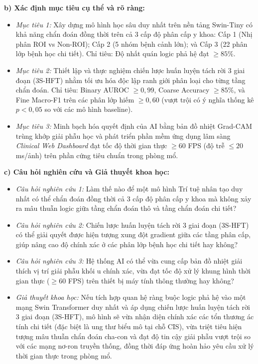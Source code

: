 \documentclass[a4paper]{article}
\begin{document}
\noindent\textbf{b) Xác định mục tiêu cụ thể và rõ ràng:}
\begin{itemize}
  \item \textit{Mục tiêu 1:} Xây dựng mô hình học sâu duy nhất trên nền tảng Swin-Tiny có khả năng chẩn đoán đồng thời trên cả 3 cấp độ phân cấp y khoa: Cấp 1 (Nhị phân ROI vs Non-ROI); Cấp 2 (5 nhóm bệnh cảnh lớn); và Cấp 3 (22 phân lớp bệnh học chi tiết). Chỉ tiêu: Độ nhất quán logic phả hệ đạt $\ge 85\%$.
  \item \textit{Mục tiêu 2:} Thiết lập và thực nghiệm chiến lược huấn luyện tách rời 3 giai đoạn (3S-HFT) nhằm tối ưu hóa độc lập ranh giới phân loại cho từng tầng chẩn đoán. Chỉ tiêu: Binary AUROC $\ge 0,99$, Coarse Accuracy $\ge 85\%$, và Fine Macro-F1 trên các phân lớp hiếm $\ge 0,60$ (vượt trội có ý nghĩa thống kê $p < 0,05$ so với các mô hình baseline).
  \item \textit{Mục tiêu 3:} Minh bạch hóa quyết định của AI bằng bản đồ nhiệt Grad-CAM trùng khớp giải phẫu học và phát triển phần mềm ứng dụng lâm sàng \textit{Clinical Web Dashboard} đạt tốc độ thời gian thực $\ge 60$ FPS (độ trễ $\le 20$ ms/ảnh) trên phần cứng tiêu chuẩn trong phòng mổ.
\end{itemize}

\noindent\textbf{c) Câu hỏi nghiên cứu và Giả thuyết khoa học:}
\begin{itemize}
  \item \textit{Câu hỏi nghiên cứu 1:} Làm thế nào để một mô hình Trí tuệ nhân tạo duy nhất có thể chẩn đoán đồng thời cả 3 cấp độ phân cấp y khoa mà không xảy ra mâu thuẫn logic giữa tầng chẩn đoán thô và tầng chẩn đoán chi tiết?
  \item \textit{Câu hỏi nghiên cứu 2:} Chiến lược huấn luyện tách rời 3 giai đoạn (3S-HFT) có thể giải quyết được hiện tượng xung đột gradient giữa các tầng phân cấp, giúp nâng cao độ chính xác ở các phân lớp bệnh học chi tiết hay không?
  \item \textit{Câu hỏi nghiên cứu 3:} Hệ thống AI có thể vừa cung cấp bản đồ nhiệt giải thích vị trí giải phẫu khối u chính xác, vừa đạt tốc độ xử lý khung hình thời gian thực ($\ge 60$ FPS) trên thiết bị máy tính thông thường hay không?
  \item \textit{Giả thuyết khoa học:} Nếu tích hợp quan hệ ràng buộc logic phả hệ vào một mạng Swin Transformer duy nhất và áp dụng chiến lược huấn luyện tách rời 3 giai đoạn (3S-HFT), mô hình sẽ vừa nhận diện chính xác các tổn thương ác tính chi tiết (đặc biệt là ung thư biểu mô tại chỗ CIS), vừa triệt tiêu hiện tượng mâu thuẫn chẩn đoán cha-con và đạt độ tin cậy giải phẫu vượt trội so với các mạng nơ-ron truyền thống, đồng thời đáp ứng hoàn hảo yêu cầu xử lý thời gian thực trong phòng mổ.
\end{itemize}
\end{document}
